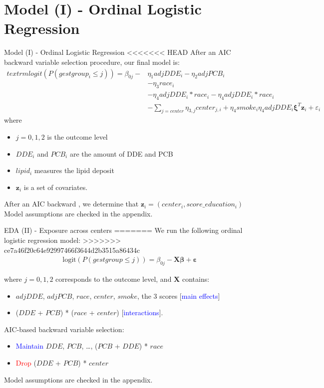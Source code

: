 \documentclass{beamer}\usepackage[]{graphicx}\usepackage[]{color}
\begin{document}
\section{Model (I) - Ordinal Logistic Regression}
\begin{frame}{Model (I) - Ordinal Logistic Regression}
<<<<<<< HEAD
\footnotesize
After an AIC backward variable selection procedure, our final model is:
\begin{align*}
textrm{logit}(P(gestgroup_i \leq j)) = \beta_{0j} - &\eta_1adjDDE_i - \eta_2adjPCB_i \\
&-\eta_3 race_i \\
&-\eta_4adjDDE_i*race_i -\eta_4adjDDE_i*race_i \\
&- \sum_{j = center}\eta_{3,j}center_{j,i} + \eta_4smoke_i \eta_4adjDDE_i\boldsymbol{\xi}^T\mathbf{z}_i + \varepsilon_i
\end{align*}
where 
\begin{itemize}
\item $j = 0,1,2$ is the outcome level
\item $DDE_i$ and $PCB_i$ are the amount of DDE and PCB
\item $lipid_i$ measures the lipid deposit 
\item $\mathbf{z}_i$ is a set of covariates. 
\end{itemize}
After an AIC backward , we determine that $\mathbf{z}_i = (center_i, score\_education_i)$\\
Model assumptions are checked in the appendix.
\end{frame}



\begin{frame}{EDA (II) - Exposure across centers}
=======
We run the following ordinal logistic regression model:
>>>>>>> ce7a46f20c64e92997466f3644d2b3515a86434c
\begin{align*}
	\textrm{logit}(P(gestgroup \leq j)) = \beta_{0j} - \mathbf{X} \boldsymbol{\beta} + \boldsymbol{\varepsilon}
\end{align*}

where $j = 0,1,2$ corresponds to the outcome level, and \textbf{X} contains:
\begin{itemize}
	\item $adjDDE$, $adjPCB$, $race$, $center$, $smoke$, the 3 scores [\textcolor{blue}{main effects}]
	\item ($DDE$ + $PCB$) * ($race$ + $center$) [\textcolor{blue}{interactions}].
\end{itemize}
\medskip
AIC-based backward variable selection:
\begin{itemize}
	\item \textcolor{blue}{Maintain} $DDE$, $PCB$, \dots, ($PCB$ + $DDE$) * $race$
	\item \textcolor{red}{Drop} ($DDE$ + $PCB$) * $center$ 
\end{itemize}

Model assumptions are checked in the appendix.
\end{frame}
\end{document}
